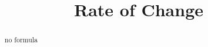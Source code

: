 \documentclass{ximera}
\title{Rate of Change}
\begin{document}
\begin{abstract}
no formula
\end{abstract}
\maketitle
\end{document}
